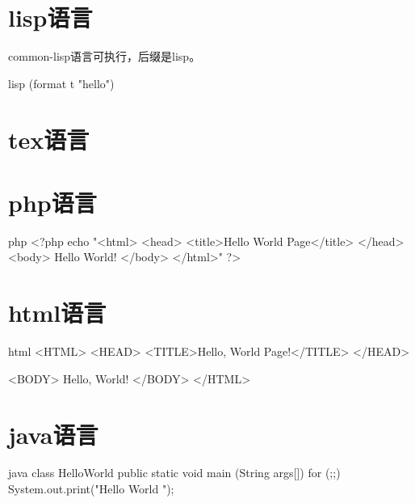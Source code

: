 \documentclass[11pt,oneside]{book}
\newlength{\textpt}
\newif\ifphone
\begin{document}
\begin{common-format}
\chapter{lisp语言}
common-lisp语言可执行，后缀是lisp。
\begin{xverbatim}[129]{lisp}
(format t "hello")
\end{xverbatim}

\chapter{tex语言}


\chapter{php语言}
\begin{xverbatim}{php}
<?php
echo "<html>
<head>
<title>Hello World Page</title>
</head>
<body>
Hello World!
</body>
</html>"
?>
\end{xverbatim}

\chapter{html语言}
\begin{xverbatim}{html}
<HTML>
<HEAD>
<TITLE>Hello, World Page!</TITLE>
</HEAD>

<BODY>
Hello, World!
</BODY>
</HTML>
\end{xverbatim}

\chapter{java语言}
\begin{xverbatim}{java}
class HelloWorld {
        public static void main (String args[]) {
        for (;;) {
                 System.out.print("Hello World ");
                 }
        }
}
\end{xverbatim}


\end{common-format}
\end{document}
